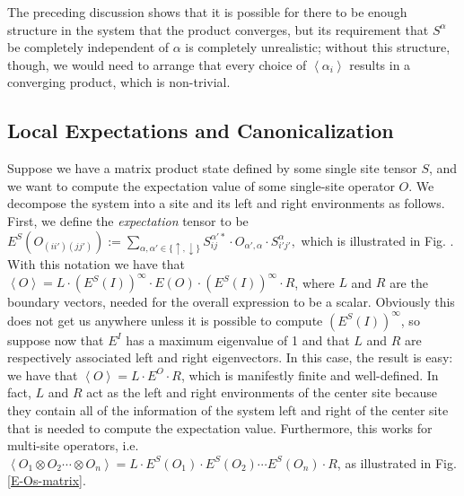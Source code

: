 \documentclass{article}
\newcommand{\seq}[1]{\left<#1\right>}
\newcommand{\expect}[1]{\left<#1\right>}
\begin{document}
The preceding discussion shows that it is possible for there to be enough structure in the system that the product converges, but its requirement that $S^\alpha$ be completely independent of $\alpha$ is completely unrealistic;  without this structure, though, we would need to arrange that every choice of $\seq{\alpha_i}$ results in a converging product, which is non-trivial.

\subsection{Local Expectations and Canonicalization}

Suppose we have a matrix product state defined by some single site tensor $S$, and we want to compute the expectation value of some single-site operator $O$.  We decompose the system into a site and its left and right environments as follows.  First, we define the \emph{expectation} tensor to be $E^S(O_{(ii')(jj')}):=\sum_{\alpha,\alpha'\in\{\uparrow,\downarrow\}}S^{\alpha'*}_{ij}\cdot O_{\alpha',\alpha}\cdot S^\alpha_{i'j'},$ which is illustrated in Fig. .  With this notation we have that $\expect{O}=L\cdot (E^S(I))^\infty\cdot E(O)\cdot(E^S(I))^\infty\cdot R$, where $L$ and $R$ are the boundary vectors, needed for the overall expression to be a scalar.  Obviously this does not get us anywhere unless it is possible to compute $(E^S(I))^\infty$, so suppose now that $E^I$ has a maximum eigenvalue of 1 and that $L$ and $R$ are respectively associated left and right eigenvectors.  In this case, the result is easy:  we have that $\expect{O}=L\cdot E^O\cdot R$, which is manifestly finite and well-defined.  In fact, $L$ and $R$ act as the left and right environments of the center site because they contain all of the information of the system left and right of the center site that is needed to compute the expectation value.  Furthermore, this works for multi-site operators, i.e. $\expect{O_1\otimes O_2\cdots\otimes O_n} = L\cdot E^S(O_1)\cdot E^S(O_2)\cdots E^S(O_n)\cdot R$, as illustrated in Fig. \ref{E-Os-matrix}.
\end{document}
